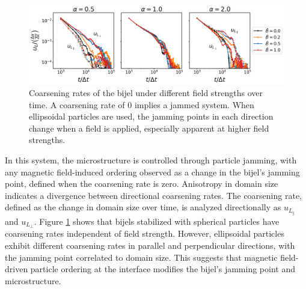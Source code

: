 \begin{figure}
    \centering
    \includegraphics[scale = 0.5]{figures/results/paper1/coarsening_vel.png}
    \caption{Coarsening rates of the bijel under different field strengths over time. A coarsening rate of 0 implies a jammed system. When ellipsoidal particles are used, the jamming points in each direction change when a field is applied, especially apparent at higher field strengths.}
    \label{fig:P1_coarsen}
\end{figure}


In this system, the microstructure is controlled through particle jamming, with any magnetic field-induced ordering observed as a change in the bijel's jamming point, defined when the coarsening rate is zero. Anisotropy in domain size indicates a divergence between directional coarsening rates. The coarsening rate, defined as the change in domain size over time, is analyzed directionally as $u_{L_{\parallel}}$ and $u_{L_{\perp}}$. Figure \ref{fig:P1_coarsen} shows that bijels stabilized with spherical particles have coarsening rates independent of field strength. However, ellipsoidal particles exhibit different coarsening rates in parallel and perpendicular directions, with the jamming point correlated to domain size. This suggests that magnetic field-driven particle ordering at the interface modifies the bijel's jamming point and microstructure.


